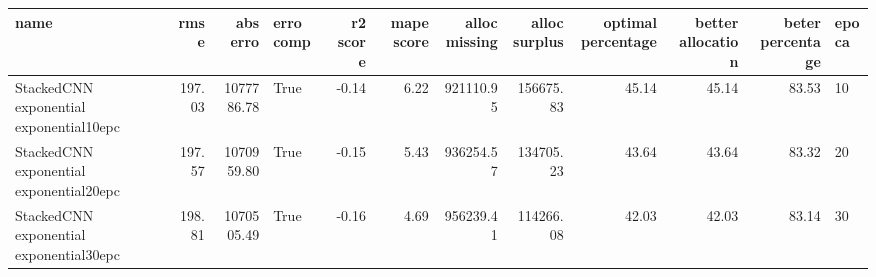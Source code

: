 \begin{tabular}{lrrlrrrrrrrl}
\toprule
name & rmse & abs erro & erro comp & r2 score & mape score & alloc missing & alloc surplus & optimal percentage & better allocation & beter percentage & epoca \\
\midrule
StackedCNN exponential exponential10epc & 197.03 & 1077786.78 & True & -0.14 & 6.22 & 921110.95 & 156675.83 & 45.14 & 45.14 & 83.53 & 10 \\
StackedCNN exponential exponential20epc & 197.57 & 1070959.80 & True & -0.15 & 5.43 & 936254.57 & 134705.23 & 43.64 & 43.64 & 83.32 & 20 \\
StackedCNN exponential exponential30epc & 198.81 & 1070505.49 & True & -0.16 & 4.69 & 956239.41 & 114266.08 & 42.03 & 42.03 & 83.14 & 30 \\
\bottomrule
\end{tabular}
